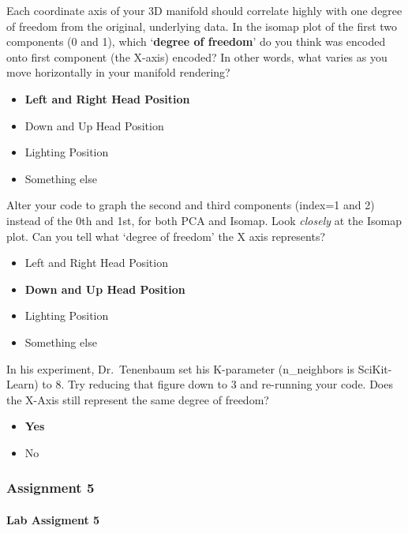 \documentclass[11pt]{article}
\providecommand{\tightlist}{%
      \setlength{\itemsep}{0pt}\setlength{\parskip}{0pt}}
\begin{document}
Each coordinate axis of your 3D manifold should correlate highly with
one degree of freedom from the original, underlying data. In the isomap
plot of the first two components (0 and 1), which `\textbf{degree of
freedom}' do you think was encoded onto first component (the X-axis)
encoded? In other words, what varies as you move horizontally in your
manifold rendering?

\begin{itemize}
\tightlist
\item
  \textbf{Left and Right Head Position}
\item
  Down and Up Head Position
\item
  Lighting Position
\item
  Something else
\end{itemize}

Alter your code to graph the second and third components (index=1 and 2)
instead of the 0th and 1st, for both PCA and Isomap. Look \emph{closely}
at the Isomap plot. Can you tell what `degree of freedom' the X axis
represents?

\begin{itemize}
\tightlist
\item
  Left and Right Head Position
\item
  \textbf{Down and Up Head Position}
\item
  Lighting Position
\item
  Something else
\end{itemize}

In his experiment, Dr.~Tenenbaum set his K-parameter (n\_neighbors is
SciKit-Learn) to 8. Try reducing that figure down to 3 and re-running
your code. Does the X-Axis still represent the same degree of freedom?

\begin{itemize}
\tightlist
\item
  \textbf{Yes}
\item
  No
\end{itemize}

\hypertarget{assignment-5}{%
\subsubsection{Assignment 5}\label{assignment-5}}

\hypertarget{lab-assigment-5}{%
\paragraph{Lab Assigment 5}\label{lab-assigment-5}}
\end{document}
